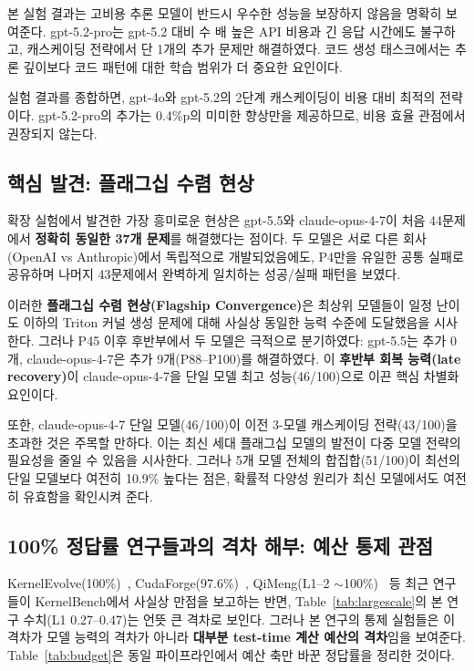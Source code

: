 \documentclass[sigplan,screen,review,anonymous]{acmart}
\begin{document}
본 실험 결과는 고비용 추론 모델이 반드시 우수한 성능을 보장하지 않음을 명확히 보여준다. gpt-5.2-pro는 gpt-5.2 대비 수 배 높은 API 비용과 긴 응답 시간에도 불구하고, 캐스케이딩 전략에서 단 1개의 추가 문제만 해결하였다. 코드 생성 태스크에서는 추론 깊이보다 코드 패턴에 대한 학습 범위가 더 중요한 요인이다.

실험 결과를 종합하면, gpt-4o와 gpt-5.2의 2단계 캐스케이딩이 비용 대비 최적의 전략이다. gpt-5.2-pro의 추가는 0.4\%p의 미미한 향상만을 제공하므로, 비용 효율 관점에서 권장되지 않는다.

\subsection{핵심 발견: 플래그십 수렴 현상}

확장 실험에서 발견한 가장 흥미로운 현상은 gpt-5.5와 claude-opus-4-7이 처음 44문제에서 \textbf{정확히 동일한 37개 문제}를 해결했다는 점이다. 두 모델은 서로 다른 회사(OpenAI vs Anthropic)에서 독립적으로 개발되었음에도, P4만을 유일한 공통 실패로 공유하며 나머지 43문제에서 완벽하게 일치하는 성공/실패 패턴을 보였다.

이러한 \textbf{플래그십 수렴 현상(Flagship Convergence)}은 최상위 모델들이 일정 난이도 이하의 Triton 커널 생성 문제에 대해 사실상 동일한 능력 수준에 도달했음을 시사한다. 그러나 P45 이후 후반부에서 두 모델은 극적으로 분기하였다: gpt-5.5는 추가 0개, claude-opus-4-7은 추가 9개(P88--P100)를 해결하였다. 이 \textbf{후반부 회복 능력(late recovery)}이 claude-opus-4-7을 단일 모델 최고 성능(46/100)으로 이끈 핵심 차별화 요인이다.

또한, claude-opus-4-7 단일 모델(46/100)이 이전 3-모델 캐스케이딩 전략(43/100)을 초과한 것은 주목할 만하다. 이는 최신 세대 플래그십 모델의 발전이 다중 모델 전략의 필요성을 줄일 수 있음을 시사한다. 그러나 5개 모델 전체의 합집합(51/100)이 최선의 단일 모델보다 여전히 10.9\% 높다는 점은, 확률적 다양성 원리가 최신 모델에서도 여전히 유효함을 확인시켜 준다.

\subsection{100\% 정답률 연구들과의 격차 해부: 예산 통제 관점}
\label{subsec:gap_anatomy}

KernelEvolve(100\%)~\cite{liao2026kernelevolve}, CudaForge(97.6\%)~\cite{cudaforge2025}, QiMeng(L1--2 $\sim$100\%)~\cite{qimengkernel2026} 등 최근 연구들이 KernelBench에서 사실상 만점을 보고하는 반면, Table~\ref{tab:largescale}의 본 연구 수치(L1 0.27--0.47)는 언뜻 큰 격차로 보인다. 그러나 본 연구의 통제 실험들은 이 격차가 모델 능력의 격차가 아니라 \textbf{대부분 test-time 계산 예산의 격차}임을 보여준다. Table~\ref{tab:budget}은 동일 파이프라인에서 예산 축만 바꾼 정답률을 정리한 것이다.
\end{document}
